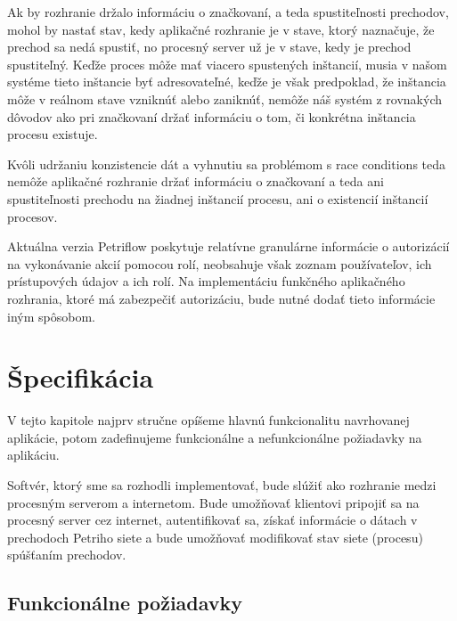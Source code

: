 Ak by rozhranie držalo informáciu o značkovaní, a teda spustiteľnosti prechodov, mohol by nastať stav, kedy aplikačné rozhranie je v stave, ktorý naznačuje, že prechod sa nedá spustiť, no procesný server už je v stave, kedy je prechod spustiteľný. Keďže proces môže mať viacero spustených inštancií, musia v našom systéme tieto inštancie byť adresovateľné, keďže je však predpoklad, že inštancia môže v reálnom stave vzniknúť alebo zaniknúť, nemôže náš systém z rovnakých dôvodov ako pri značkovaní držať informáciu o tom, či konkrétna inštancia procesu existuje. 

Kvôli udržaniu konzistencie dát a vyhnutiu sa problémom s race conditions teda nemôže aplikačné rozhranie držať informáciu o značkovaní a teda ani spustiteľnosti prechodu na žiadnej inštancií procesu, ani o existencií inštancií procesov.

Aktuálna verzia Petriflow poskytuje relatívne granulárne informácie o autorizácií na vykonávanie akcií pomocou rolí, neobsahuje však zoznam používateľov, ich prístupových údajov a ich rolí. Na implementáciu funkčného aplikačného rozhrania, ktoré má zabezpečiť autorizáciu, bude nutné dodať tieto informácie iným spôsobom.


\section{Špecifikácia}

V tejto kapitole najprv stručne opíšeme hlavnú funkcionalitu navrhovanej aplikácie, potom zadefinujeme funkcionálne a nefunkcionálne požiadavky na aplikáciu.

Softvér, ktorý sme sa rozhodli implementovať, bude slúžiť ako rozhranie medzi procesným serverom a internetom. Bude umožňovať klientovi pripojiť sa na procesný server cez internet, autentifikovať sa, získať informácie o dátach v prechodoch Petriho siete a bude umožňovať modifikovať stav siete (procesu) spúšťaním prechodov.

\subsection{Funkcionálne požiadavky}


